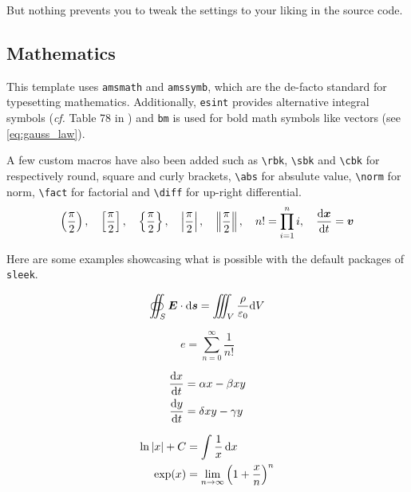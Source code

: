 \documentclass[a4paper, 12pt]{report}
\def\tbs{\textbackslash}
\begin{document}
    But nothing prevents you to tweak the settings to your liking in the source code.

    \subsection{Mathematics}

    This template uses \texttt{amsmath} and \texttt{amssymb}, which are the de-facto standard for typesetting mathematics. Additionally, \texttt{esint} provides alternative integral symbols (\emph{cf.} Table 78 in \cite{pakin2020comprehensive}) and \texttt{bm} is used for bold math symbols like vectors (see \eqref{eq:gauss_law}).

    A few custom macros have also been added such as \texttt{\tbs{}rbk}, \texttt{\tbs{}sbk} and \texttt{\tbs{}cbk} for respectively round, square and curly brackets, \texttt{\tbs{}abs} for absulute value, \texttt{\tbs{}norm} for norm, \texttt{\tbs{}fact} for factorial and \texttt{\tbs{}diff} for up-right differential.
    $$
        \left(\frac{\pi}{2}\right), \quad \left[\frac{\pi}{2}\right], \quad \left\{\frac{\pi}{2}\right\}, \quad \left|\frac{\pi}{2}\right|, \quad \left\|\frac{\pi}{2}\right\|, \quad n! = \prod_{i = 1}^{n} i, \quad \frac{\mathrm{d} \bm{x}}{\mathrm{d} t} = \bm{v}
    $$

    Here are some examples showcasing what is possible with the default packages of \texttt{sleek}.

    \begin{equation}\label{eq:gauss_law}
        \oiint_S \bm{E} \cdot \mathrm{d} \bm{s} = \iiint_V \frac{\rho}{\varepsilon_0} \mathrm{d} V
    \end{equation}

    \begin{equation*}
        e = \sum_{n=0}^\infty \frac{1}{n!}
    \end{equation*}

    \begin{subequations}
        \begin{align}
            \frac{\mathrm{d} x}{\mathrm{d} t} & = \alpha x - \beta xy \\
            \frac{\mathrm{d} y}{\mathrm{d} t} & = \delta xy - \gamma y
        \end{align}
    \end{subequations}

    \begin{align*}
        \ln \left|x\right| + C & = \int \frac{1}{x} \,\mathrm{d} x \\
        \exp(x) & = \lim_{n \to \infty} \left(1 + \frac{x}{n}\right)^n
    \end{align*}
\end{document}

